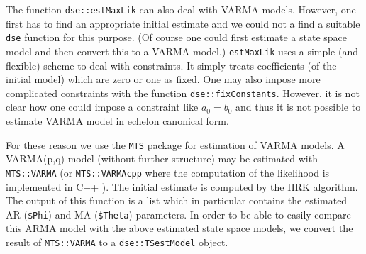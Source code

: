 \documentclass[]{article}
\begin{document}
The function \texttt{dse::estMaxLik} can also deal with VARMA models.
However, one first has to find an appropriate initial estimate and we
could not a find a suitable \texttt{dse} function for this purpose. (Of
course one could first estimate a state space model and then convert
this to a VARMA model.) \texttt{estMaxLik} uses a simple (and flexible)
scheme to deal with constraints. It simply treats coefficients (of the
initial model) which are zero or one as fixed. One may also impose more
complicated constraints with the function \texttt{dse::fixConstants}.
However, it is not clear how one could impose a constraint like
\(a_0=b_0\) and thus it is not possible to estimate VARMA model in
echelon canonical form.

For these reason we use the \texttt{MTS} package for estimation of VARMA
models. A VARMA(p,q) model (without further structure) may be estimated
with \texttt{MTS::VARMA} (or \texttt{MTS::VARMAcpp} where the
computation of the likelihood is implemented in C++ ). The initial
estimate is computed by the HRK algorithm. The output of this function
is a list which in particular contains the estimated AR (\texttt{\$Phi})
and MA (\texttt{\$Theta}) parameters. In order to be able to easily
compare this ARMA model with the above estimated state space models, we
convert the result of \texttt{MTS::VARMA} to a \texttt{dse::TSestModel}
object.
\end{document}
